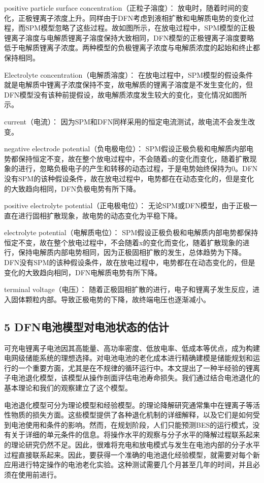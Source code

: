 \documentclass[12pt]{ctexart}%
\begin{document}
positive particle surface concentration（正粒子溶度）：
放电时，随着时间的变化，正极锂离子浓度上升。同样由于DFN考虑到液相扩散和电解质电势的变化过程，而SPM模型忽略了这些过程。故如图所示，在放电过程中，SPM模型的正极锂离子溶度与电解质锂离子溶度保持大致相同，DFN模型的正极锂离子溶度要略低于电解质锂离子浓度。两种模型的负极锂离子浓度与电解质浓度的起始和终止都保持相同。


Electrolyte concentration（电解质溶度）：
在放电过程中，SPM模型的假设条件就是电解质中锂离子浓度保持不变，故电解质的锂离子溶度是不发生变化的，但DFN模型没有该种前提假设，故电解质浓度发生较大的变化，变化情况如图所示。

current（电流）：
因为SPM和DFN同样采用的恒定电流测试，故电流不会发生改变。

negative electrode potential（负电极电位）：
SPM假设正极负极和电解质内部电势都保持恒定不变，故在整个放电过程中，不会随着x的变化而变化，随着扩散现象的进行，忽略负极电子的产生和转移的动态过程，于是电势始终保持为0。DFN没有SPM的该种假设条件，故在放电过程中，电势都在在动态变化的，但是变化的大致趋向相同，DFN负极电势有所下降。

positive electrolyte potential（正电极电位）：
无论SPM或DFN模型，由于正极一直在进行固相扩散现象，故电势的动态变化为平稳下降。

electrolyte potential（电解质电位）：
SPM假设正极负极和电解质内部电势都保持恒定不变，故在整个放电过程中，不会随着x的变化而变化，随着扩散现象的进行，保持电解质内部电势相同，因为正极固相扩散的发生，总体趋势为下降。DFN没有SPM的该种假设条件，故在放电过程中，电势都在在动态变化的，但是变化的大致趋向相同，DFN电解质电势有所下降。

terminal voltage（电压）：
随着正极固相扩散的进行，电子和锂离子发生反应，进入固体颗粒内部。导致正极电势的下降，故终端电压也逐渐减小。

\subsection{5 DFN电池模型对电池状态的估计}
可充电锂离子电池因其高能量、高功率密度、低放电率、低成本等优点，成为构建电网级储能系统的理想选择。对电池电池的老化成本进行精确建模是储能规划和运行的一个重要方面，尤其是在不规律的循环运行中。本文提出了一种半经验的锂离子电池退化模型，该模型从操作剖面评估电池寿命损失。我们通过结合电池退化的基本理论和我们的观察建立了这个模型。

电池退化模型可分为理论模型和经验模型。\cite{VETTER2005269}\cite{Ning_2004}\cite{NING20062012}的理论降解研究通常集中在锂离子等活性物质的损失方面。这些模型提供了各种退化机制的详细解释，以及它们是如何受到电池使用和条件的影响。然而，在规划阶段，人们只能预测BES的运行模式，没有关于详细的单元条件的信息。将操作水平的观察与分子水平的降解过程联系起来的理论研究仍然不足\cite{smith2014models}\cite{laresgoiti2015modeling}。因此，很难将充电和放电模式与发生在电池内部的分子水平过程直接联系起来。因此，要获得一个准确的电池退化经验模型，就需要对每个新应用进行特定操作的电池老化实验。这种测试需要几个月甚至几年的时间，并且必须在使用前进行。
\end{document}
